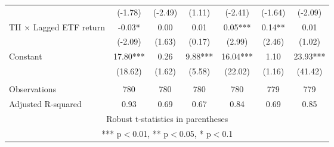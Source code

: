 \documentclass[]{article}
\begin{document}
\begin{tabular}{lcccccc}
 & (-1.78) & (-2.49) & (1.11) & (-2.41) & (-1.64) & (-2.09) \\
TII $\times$ Lagged ETF return & -0.03* & 0.00 & 0.01 & 0.05*** & 0.14** & 0.01 \\
 & (-2.09) & (1.63) & (0.17) & (2.99) & (2.46) & (1.02) \\
Constant & 17.80*** & 0.26 & 9.88*** & 16.04*** & 1.10 & 23.93*** \\
 & (18.62) & (1.62) & (5.58) & (22.02) & (1.16) & (41.42) \\
 &  &  &  &  &  &  \\
Observations & 780 & 780 & 780 & 780 & 779 & 779 \\
 Adjusted R-squared & 0.93 & 0.69 & 0.67 & 0.84 & 0.69 & 0.85 \\ \hline
\multicolumn{7}{c}{ Robust t-statistics in parentheses} \\
\multicolumn{7}{c}{ *** p$<$0.01, ** p$<$0.05, * p$<$0.1} \\
\end{tabular}
\end{document}
